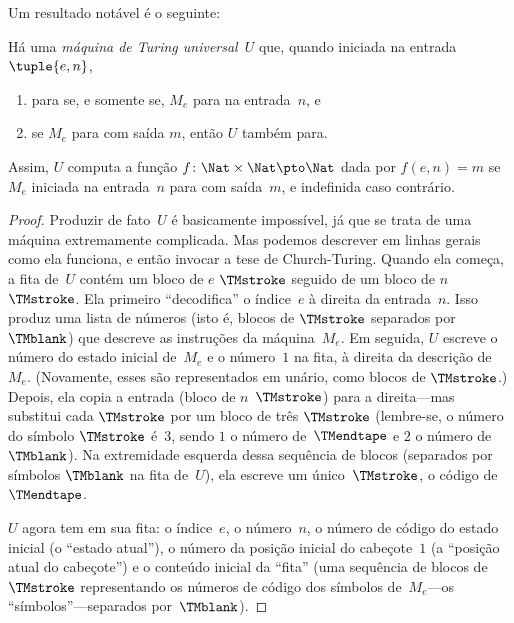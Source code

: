 \documentclass[../../../include/open-logic-section]{subfiles}
\begin{document}
Um resultado notável é o seguinte:

\begin{thm} Há uma \emph{máquina de Turing
  universal}~$U$ que, quando iniciada na entrada $\tuple{e,n}$,
  \begin{enumerate}
    \item para se, e somente se, $M_e$ para na entrada~$n$, e
    \item se $M_e$ para com saída $m$, então $U$ também para.
  \end{enumerate}
  Assim, $U$ computa a função $f\colon \Nat \times \Nat \pto \Nat$
  dada por $f(e,n) = m$ se $M_e$ iniciada na entrada~$n$ para com
  saída~$m$, e indefinida caso contrário.
\end{thm}

\begin{proof}
  Produzir de fato~$U$ é basicamente impossível, já que se trata de
  uma máquina extremamente complicada. Mas podemos descrever em linhas
  gerais como ela funciona, e então invocar a tese de Church-Turing.
  Quando ela começa, a fita de~$U$ contém um bloco de $e$ $\TMstroke$
  seguido de um bloco de $n$~$\TMstroke$. Ela primeiro ``decodifica''
  o índice~$e$ à direita da entrada~$n$. Isso produz uma lista de
  números (isto é, blocos de $\TMstroke$ separados por~$\TMblank$) que
  descreve as instruções da máquina~$M_e$. Em seguida, $U$ escreve o
  número do estado inicial de~$M_e$ e o número~$1$ na fita, à direita
  da descrição de~$M_e$. (Novamente, esses são representados em unário,
  como blocos de $\TMstroke$.) Depois, ela copia a entrada (bloco de
  $n$~$\TMstroke$) para a direita---mas substitui cada $\TMstroke$ por
  um bloco de três $\TMstroke$ (lembre-se, o número do símbolo
  $\TMstroke$ é~$3$, sendo $1$ o número de~$\TMendtape$ e $2$ o número
  de~$\TMblank$). Na extremidade esquerda dessa sequência de blocos
  (separados por símbolos $\TMblank$ na fita de~$U$), ela escreve um
  único~$\TMstroke$, o código de~$\TMendtape$.

  $U$ agora tem em sua fita: o índice~$e$, o número~$n$, o número de
  código do estado inicial (o ``estado atual''), o número da posição
  inicial do cabeçote~$1$ (a ``posição atual do cabeçote'') e o
  conteúdo inicial da ``fita'' (uma sequência de blocos
  de~$\TMstroke$ representando os números de código dos símbolos
  de~$M_e$---os ``símbolos''---separados por~$\TMblank$).


\end{proof}
\end{document}
